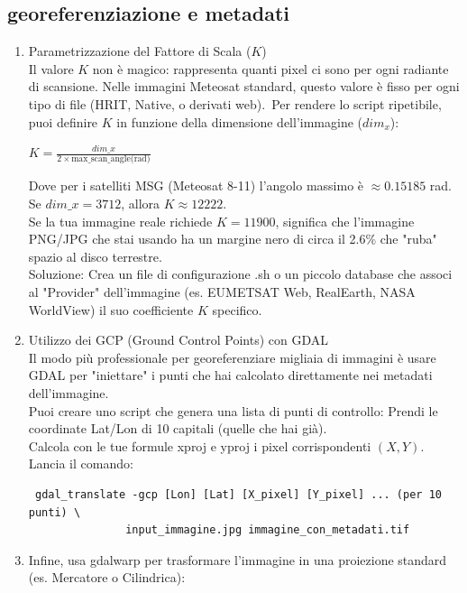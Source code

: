 \documentclass[a4paper,14pt]{article}
\begin{document}
\subsection{georeferenziazione e metadati}
\begin{enumerate}
\item Parametrizzazione del Fattore di Scala (\(K\))\\
Il valore \(K\) non è magico: rappresenta quanti pixel ci sono per ogni radiante di scansione. Nelle immagini Meteosat standard, questo valore è fisso per ogni tipo di file (HRIT, Native, o derivati web). Per rendere lo script ripetibile, puoi definire \(K\) in funzione della dimensione dell'immagine (\(dim_{x}\)):\\
\begin{center}
\(K=\frac{dim\_x}{2\times \text{max\_scan\_angle(rad)}}\)\\                                                      \end{center}
Dove per i satelliti MSG (Meteosat 8-11) l'angolo massimo è \(\approx 0.15185\) rad.\\
Se \(dim\_x=3712\), allora \(K\approx 12222\).\\
Se la tua immagine reale richiede \(K=11900\), significa che l'immagine PNG/JPG che stai usando ha un margine nero di circa il 2.6\% che "ruba" spazio al disco terrestre.\\
Soluzione: Crea un file di configurazione .sh o un piccolo database che associ al "Provider" dell'immagine (es. EUMETSAT Web, RealEarth, NASA WorldView) il suo coefficiente \(K\) specifico.
\item Utilizzo dei GCP (Ground Control Points) con GDAL\\
Il modo più professionale per georeferenziare migliaia di immagini è usare GDAL per "iniettare" i punti che hai calcolato direttamente nei metadati dell'immagine.\\
Puoi creare uno script che genera una lista di punti di controllo: Prendi le coordinate Lat/Lon di 10 capitali (quelle che hai già).\\
Calcola con le tue formule xproj e yproj i pixel corrispondenti \((X,Y)\). Lancia il comando:\\
\begin{verbatim}
 gdal_translate -gcp [Lon] [Lat] [X_pixel] [Y_pixel] ... (per 10 punti) \
               input_immagine.jpg immagine_con_metadati.tif
\end{verbatim}
\item Infine, usa gdalwarp per trasformare l'immagine in una proiezione standard (es. Mercatore o Cilindrica):

\end{enumerate}
\end{document}
